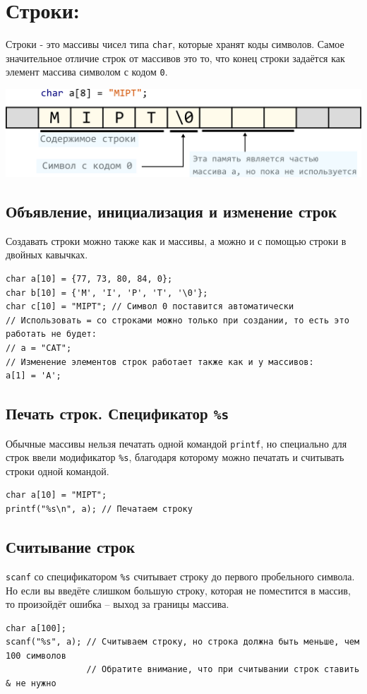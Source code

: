 \documentclass{article}
\begin{document}
\section*{Строки:}
Строки - это массивы чисел типа \texttt{char}, которые хранят коды символов. Самое значительное отличие строк от массивов это то, что конец строки задаётся как элемент массива символом с кодом \texttt{0}. 

\begin{center}
\includegraphics[scale=0.75]{../images/string_in_memory.png}
\end{center}

\subsection*{Объявление, инициализация и изменение строк}
Создавать строки можно также как и массивы, а можно и с помощью строки в двойных кавычках.
\begin{lstlisting}
char a[10] = {77, 73, 80, 84, 0};
char b[10] = {'M', 'I', 'P', 'T', '\0'};
char c[10] = "MIPT"; // Символ 0 поставится автоматически
// Использовать = со строками можно только при создании, то есть это работать не будет:
// a = "CAT";
// Изменение элементов строк работает также как и у массивов:
a[1] = 'A';
\end{lstlisting}

\subsection*{Печать строк. Спецификатор \texttt{\%s}}
Обычные массивы нельзя печатать одной командой \texttt{printf}, но специально для строк ввели модификатор \texttt{\%s}, благодаря которому можно печатать и считывать строки одной командой.
\begin{lstlisting}
char a[10] = "MIPT";
printf("%s\n", a); // Печатаем строку
\end{lstlisting}


\subsection*{Считывание строк}
\texttt{scanf} со спецификатором \texttt{\%s} считывает строку до первого пробельного символа. 
Но если вы введёте слишком большую строку, которая не поместится в массив, то произойдёт ошибка -- выход за границы массива.
\begin{lstlisting}
char a[100];
scanf("%s", a); // Считываем строку, но строка должна быть меньше, чем 100 символов
                // Обратите внимание, что при считывании строк ставить & не нужно
\end{lstlisting}
\end{document}
